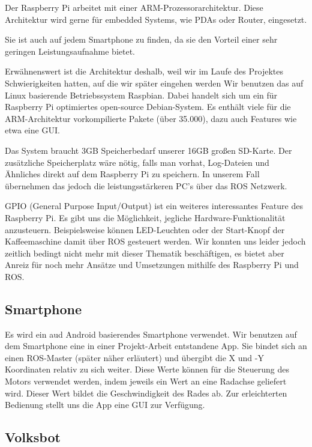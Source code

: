 \documentclass[12pt]{article}
\begin{document}
Der Raspberry Pi arbeitet mit einer ARM-Prozessorarchitektur.
Diese Architektur wird gerne für embedded Systems, wie PDAs oder Router, eingesetzt.

Sie ist auch auf jedem Smartphone zu finden, da sie den Vorteil einer sehr geringen Leistungsaufnahme bietet. 

Erwähnenswert ist die Architektur deshalb, weil wir im Laufe des Projektes Schwierigkeiten hatten, auf die wir später eingehen werden
Wir benutzen das auf Linux basierende Betriebssystem Raspbian.
Dabei handelt sich um ein für Raspberry Pi optimiertes open-source Debian-System.
Es enthält viele für die ARM-Architektur vorkompilierte Pakete (über 35.000), dazu auch Features wie etwa eine GUI.

Das System braucht 3GB Speicherbedarf unserer 16GB großen SD-Karte.
Der zusätzliche Speicherplatz wäre nötig, falls man vorhat, Log-Dateien und Ähnliches direkt auf dem Raspberry Pi zu speichern. 
In unserem Fall übernehmen das jedoch die leistungsstärkeren PC's über das ROS Netzwerk.

GPIO (General Purpose Input/Output) ist ein weiteres interessantes Feature des Raspberry Pi.
Es gibt uns die Möglichkeit, jegliche Hardware-Funktionalität anzusteuern.
Beispielsweise können LED-Leuchten oder der Start-Knopf der Kaffeemaschine damit über ROS gesteuert werden.
Wir konnten uns leider jedoch zeitlich bedingt nicht mehr mit dieser Thematik beschäftigen, es bietet aber Anreiz für noch mehr Ansätze und Umsetzungen mithilfe des Raspberry Pi und ROS.


\subsection{Smartphone}

Es wird ein aud Android basierendes Smartphone verwendet.
Wir benutzen auf dem Smartphone eine in einer Projekt-Arbeit entstandene App.
Sie bindet sich an einen ROS-Master (später näher erläutert) und übergibt die X und -Y Koordinaten relativ zu sich weiter.
Diese Werte können für die Steuerung des Motors verwendet werden, indem jeweils ein Wert an eine Radachse geliefert wird. Dieser Wert bildet die Geschwindigkeit des Rades ab.
Zur erleichterten Bedienung stellt uns die App eine GUI zur Verfügung. 

\subsection{Volksbot}
\end{document}
